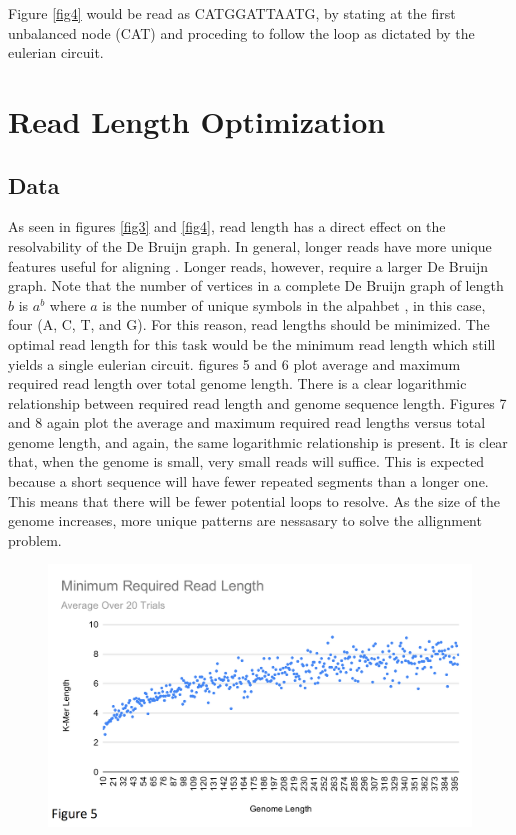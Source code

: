 \documentclass[letterpaper, 10 pt]{ieeeconf}
\begin{document}
  \break

  Figure \ref{fig4} would be read as CATGGATTAATG, by stating at the first unbalanced
  node (CAT) and proceding to follow the loop as dictated by the eulerian circuit.
  
  \section{Read Length Optimization}
  \subsection{Data}
  As seen in figures \ref{fig3} and \ref{fig4}, read length has a direct effect
  on the resolvability of the De Bruijn graph.  In general, longer reads have
  more unique features useful for aligning \cite{langmead}.  Longer reads, however,
  require a larger De Bruijn graph.  Note that the number of vertices in a complete
  De Bruijn graph of length $b$ is $a^b$ where $a$ is the number of unique symbols
  in the alpahbet \cite{wikipedia}, in this case, four (A, C, T, and G).  For this
  reason, read lengths should be minimized.  The optimal read length for this task
  would be the minimum read length which still yields a single eulerian circuit.
  figures 5 and 6 plot average and maximum required read length
  over total genome length.  There is a clear logarithmic relationship between
  required read length and genome sequence length.  Figures 7 and 8
  again plot the average and maximum required read lengths versus total genome length,
  and again, the same logarithmic relationship is present.  It is clear that, when 
  the genome is small, very small reads will suffice.  This is expected because a 
  short sequence will have fewer repeated segments than a longer one.  This means
  that there will be fewer potential loops to resolve.  As the size of the genome
  increases, more unique patterns are nessasary to solve the allignment problem.

  \begin{figure}[thpb]
    \centering
    \includegraphics[scale=0.36]{images/Minimum_Required_Read_Length_(1).png}
    \label{fig5}
  \end{figure}
\end{document}

